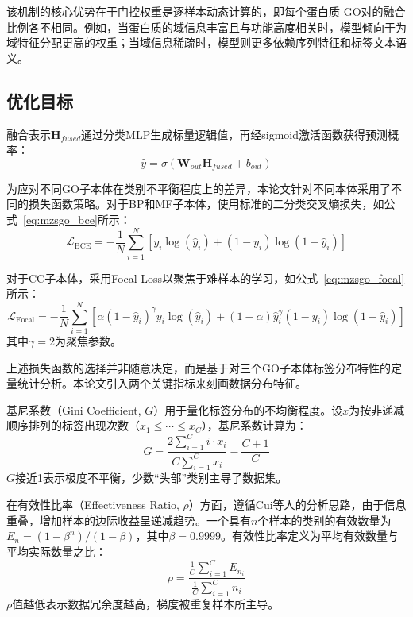该机制的核心优势在于门控权重是逐样本动态计算的，即每个蛋白质-GO对的融合比例各不相同。例如，当蛋白质的域信息丰富且与功能高度相关时，模型倾向于为域特征分配更高的权重；当域信息稀疏时，模型则更多依赖序列特征和标签文本语义。

\subsection{优化目标}

融合表示$\mathbf{H}_{fused}$通过分类MLP生成标量逻辑值，再经sigmoid激活函数获得预测概率：
\begin{equation}
    \hat{y} = \sigma(\mathbf{W}_{out}\mathbf{H}_{fused} + b_{out})
\end{equation}

为应对不同GO子本体在类别不平衡程度上的差异，本论文针对不同本体采用了不同的损失函数策略。对于BP和MF子本体，使用标准的二分类交叉熵损失，如公式~\eqref{eq:mzsgo_bce}所示：
\begin{equation}
\label{eq:mzsgo_bce}
    \mathcal{L}_{\text{BCE}} = -\frac{1}{N} \sum_{i=1}^{N} \left[ y_i \log(\hat{y}_i) + (1 - y_i) \log(1 - \hat{y}_i) \right]
\end{equation}

对于CC子本体，采用Focal Loss以聚焦于难样本的学习，如公式~\eqref{eq:mzsgo_focal}所示：
\begin{equation}
\label{eq:mzsgo_focal}
    \mathcal{L}_{\text{Focal}} = -\frac{1}{N} \sum_{i=1}^{N} \left[ \alpha (1 - \hat{y}_i)^\gamma y_i \log(\hat{y}_i) + (1 - \alpha) \hat{y}_i^\gamma (1 - y_i) \log(1 - \hat{y}_i) \right]
\end{equation}
其中$\gamma = 2$为聚焦参数。

上述损失函数的选择并非随意决定，而是基于对三个GO子本体标签分布特性的定量统计分析。本论文引入两个关键指标来刻画数据分布特征。

基尼系数（Gini Coefficient, $G$）用于量化标签分布的不均衡程度。设$x$为按非递减顺序排列的标签出现次数（$x_1 \le \cdots \le x_C$），基尼系数计算为：
\begin{equation}
    G = \frac{2 \sum_{i=1}^C i \cdot x_i}{C \sum_{i=1}^C x_i} - \frac{C+1}{C}
\end{equation}
$G$接近1表示极度不平衡，少数“头部”类别主导了数据集。

在有效性比率（Effectiveness Ratio, $\rho$）方面，遵循Cui等人\cite{cui2019class}的分析思路，由于信息重叠，增加样本的边际收益呈递减趋势。一个具有$n$个样本的类别的有效数量为$E_n = (1 - \beta^n)/(1 - \beta)$，其中$\beta = 0.9999$。有效性比率定义为平均有效数量与平均实际数量之比：
\begin{equation}
    \rho = \frac{\frac{1}{C}\sum_{i=1}^C E_{n_i}}{\frac{1}{C}\sum_{i=1}^C n_i}
\end{equation}
$\rho$值越低表示数据冗余度越高，梯度被重复样本所主导。

